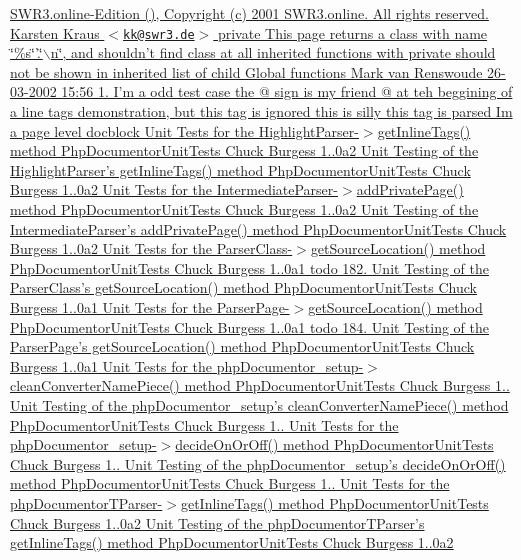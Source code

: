 \hyperlink{}{\-S\-W\-R3.\-online-\/\-Edition   (),  \-Copyright (c) 2001 \-S\-W\-R3.\-online. \-All rights reserved.  \-Karsten \-Kraus $<$\href{mailto:kk@swr3.de}{\tt kk@swr3.\-de}$>$  private  \-This page returns a class with name \char`\"{}\%s\char`\"{}'.\char`\"{}$\backslash$n\char`\"{}, and shouldn't find class at all  inherited functions with  private should not be shown in inherited list of child  \-Global functions   \-Mark van \-Renswoude  26-\/03-\/2002 15\-:56  1.  \-I'm a odd test case the @ sign is my friend @ at teh beggining of a line  tags demonstration, but this  tag is ignored  this is silly  this tag is parsed  \-Im a page level docblock  \-Unit \-Tests for the \-Highlight\-Parser-\/$>$get\-Inline\-Tags() method   \-Php\-Documentor\-Unit\-Tests  \-Chuck \-Burgess  1..\-0a2  \-Unit \-Testing of the \-Highlight\-Parser's get\-Inline\-Tags() method   \-Php\-Documentor\-Unit\-Tests  \-Chuck \-Burgess  1..\-0a2  \-Unit \-Tests for the \-Intermediate\-Parser-\/$>$add\-Private\-Page() method   \-Php\-Documentor\-Unit\-Tests  \-Chuck \-Burgess  1..\-0a2  \-Unit \-Testing of the \-Intermediate\-Parser's add\-Private\-Page() method   \-Php\-Documentor\-Unit\-Tests  \-Chuck \-Burgess  1..\-0a2  \-Unit \-Tests for the \-Parser\-Class-\/$>$get\-Source\-Location() method   \-Php\-Documentor\-Unit\-Tests  \-Chuck \-Burgess  1..\-0a1  todo 182.  \-Unit \-Testing of the \-Parser\-Class's get\-Source\-Location() method   \-Php\-Documentor\-Unit\-Tests  \-Chuck \-Burgess  1..\-0a1  \-Unit \-Tests for the \-Parser\-Page-\/$>$get\-Source\-Location() method   \-Php\-Documentor\-Unit\-Tests  \-Chuck \-Burgess  1..\-0a1  todo 184.  \-Unit \-Testing of the \-Parser\-Page's get\-Source\-Location() method   \-Php\-Documentor\-Unit\-Tests  \-Chuck \-Burgess  1..\-0a1  \-Unit \-Tests for the php\-Documentor\-\_\-setup-\/$>$clean\-Converter\-Name\-Piece() method   \-Php\-Documentor\-Unit\-Tests  \-Chuck \-Burgess  1..  \-Unit \-Testing of the php\-Documentor\-\_\-setup's clean\-Converter\-Name\-Piece() method   \-Php\-Documentor\-Unit\-Tests  \-Chuck \-Burgess  1..  \-Unit \-Tests for the php\-Documentor\-\_\-setup-\/$>$decide\-On\-Or\-Off() method   \-Php\-Documentor\-Unit\-Tests  \-Chuck \-Burgess  1..  \-Unit \-Testing of the php\-Documentor\-\_\-setup's decide\-On\-Or\-Off() method   \-Php\-Documentor\-Unit\-Tests  \-Chuck \-Burgess  1..  \-Unit \-Tests for the php\-Documentor\-T\-Parser-\/$>$get\-Inline\-Tags() method   \-Php\-Documentor\-Unit\-Tests  \-Chuck \-Burgess  1..\-0a2  \-Unit \-Testing of the php\-Documentor\-T\-Parser's get\-Inline\-Tags() method   \-Php\-Documentor\-Unit\-Tests  \-Chuck \-Burgess  1..\-0a2 }